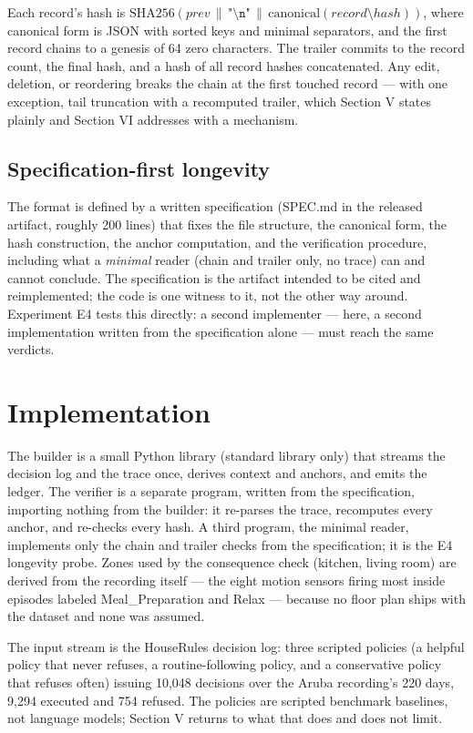 \documentclass[journal]{IEEEtran}
\begin{document}
Each record's hash is
$\mathrm{SHA256}(\mathit{prev} \,\|\, \texttt{"\textbackslash n"} \,\|\,
\mathrm{canonical}(\mathit{record}\setminus\mathit{hash}))$, where
canonical form is JSON with sorted keys and minimal separators, and
the first record chains to a genesis of 64 zero characters. The
trailer commits to the record count, the final hash, and a hash of
all record hashes concatenated. Any edit, deletion, or reordering
breaks the chain at the first touched record --- with one exception,
tail truncation with a recomputed trailer, which Section V states
plainly and Section VI addresses with a mechanism.

\subsection{Specification-first longevity}

The format is defined by a written specification (SPEC.md in the
released artifact, roughly 200 lines) that fixes the file structure,
the canonical form, the hash construction, the anchor computation, and
the verification procedure, including what a \emph{minimal} reader
(chain and trailer only, no trace) can and cannot conclude. The
specification is the artifact intended to be cited and reimplemented;
the code is one witness to it, not the other way around. Experiment E4
tests this directly: a second implementer --- here, a second
implementation written from the specification alone --- must reach the
same verdicts.


\section{Implementation}

The builder is a small Python library (standard library only) that
streams the decision log and the trace once, derives context and
anchors, and emits the ledger. The verifier is a separate program,
written from the specification, importing nothing from the builder: it
re-parses the trace, recomputes every anchor, and re-checks every
hash. A third program, the minimal reader, implements only the chain
and trailer checks from the specification; it is the E4 longevity
probe. Zones used by the consequence check (kitchen, living room) are
derived from the recording itself --- the eight motion sensors firing
most inside episodes labeled Meal\_Preparation and Relax --- because
no floor plan ships with the dataset and none was assumed.

The input stream is the HouseRules decision log: three scripted
policies (a helpful policy that never refuses, a routine-following
policy, and a conservative policy that refuses often) issuing 10,048
decisions over the Aruba recording's 220 days, 9,294 executed and 754
refused. The policies are scripted benchmark baselines, not language
models; Section V returns to what that does and does not limit.
\end{document}
